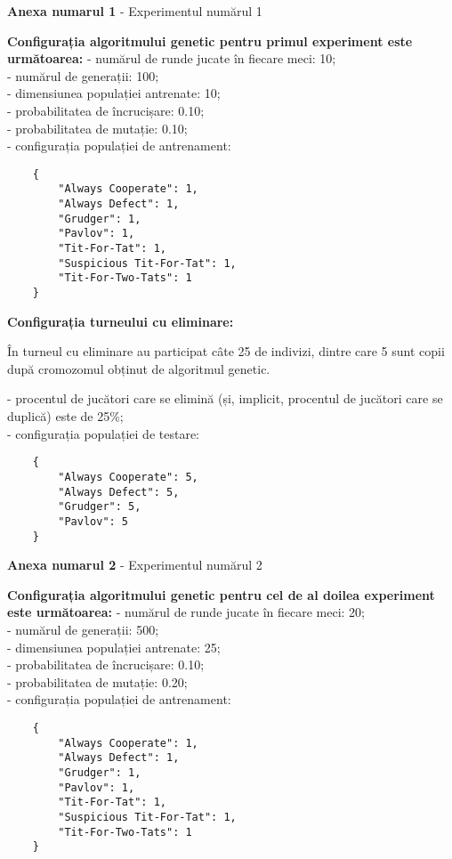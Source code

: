 \begin{center}
	\textbf{Anexa numarul 1} - Experimentul numărul 1
\end{center}

\textbf{Configurația algoritmului genetic pentru primul experiment este următoarea: }
- numărul de runde jucate în fiecare meci: 10;\\
- numărul de generații: 100;\\
- dimensiunea populației antrenate: 10;\\
- probabilitatea de încrucișare: 0.10;\\
- probabilitatea de mutație: 0.10;\\
- configurația populației de antrenament:\\
\begin{center}
	\begin{lstlisting}
	{
		"Always Cooperate": 1,
		"Always Defect": 1,
		"Grudger": 1,
		"Pavlov": 1,
		"Tit-For-Tat": 1,
		"Suspicious Tit-For-Tat": 1,
		"Tit-For-Two-Tats": 1
	}
\end{lstlisting}
\end{center}
 
\textbf{Configurația turneului cu eliminare: }

În turneul cu eliminare au participat câte 25 de indivizi, dintre care 5 sunt copii după cromozomul obținut de algoritmul genetic. 

- procentul de jucători care se elimină (și, implicit, procentul de jucători care se duplică) este de 25\%;\\
- configurația populației de testare:\\
\begin{center}
	\begin{lstlisting}
	{
		"Always Cooperate": 5,
		"Always Defect": 5,
		"Grudger": 5,
		"Pavlov": 5
	}
	\end{lstlisting}
\end{center}

\clearpage

\begin{center}
	\textbf{Anexa numarul 2} - Experimentul numărul 2
\end{center}

\textbf{Configurația algoritmului genetic pentru cel de al doilea experiment este următoarea: }
- numărul de runde jucate în fiecare meci: 20;\\
- numărul de generații: 500;\\
- dimensiunea populației antrenate: 25;\\
- probabilitatea de încrucișare: 0.10;\\
- probabilitatea de mutație: 0.20;\\
- configurația populației de antrenament:\\
\begin{center}
	\begin{lstlisting}
	{
		"Always Cooperate": 1,
		"Always Defect": 1,
		"Grudger": 1,
		"Pavlov": 1,
		"Tit-For-Tat": 1,
		"Suspicious Tit-For-Tat": 1,
		"Tit-For-Two-Tats": 1
	}
	\end{lstlisting}
\end{center}

